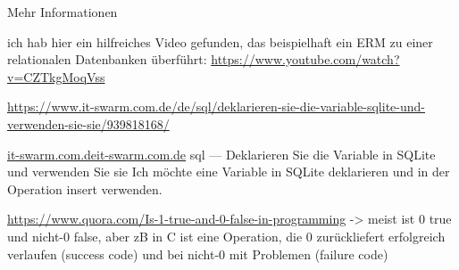 \begin{frame}{Mehr Informationen}

ich hab hier ein hilfreiches Video gefunden, das beispielhaft ein ERM zu einer relationalen Datenbanken überführt:
\protect\url{https://www.youtube.com/watch?v=CZTkgMoqVss}


\href{mehr Information}{https://www.it-swarm.com.de/de/sql/deklarieren-sie-die-variable-sqlite-und-verwenden-sie-sie/939818168/}

\protect\url{it-swarm.com.deit-swarm.com.de}
sql — Deklarieren Sie die Variable in SQLite und verwenden Sie sie
Ich möchte eine Variable in SQLite deklarieren und in der Operation insert verwenden.


\protect\url{https://www.quora.com/Is-1-true-and-0-false-in-programming}
-> meist ist 0 true und nicht-0 false, aber zB in C ist eine Operation, die 0 zurückliefert erfolgreich verlaufen (success code) und bei nicht-0 mit Problemen (failure code)

    
\end{frame}








